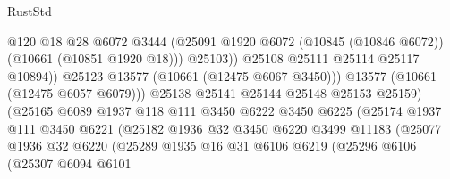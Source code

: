 \begin{lexlean}{RustStd}
\begin{coremodule}
                                        @120
                                        @18
                                        @28
                                        @6072
                                        @3444
                                        (@25091
                                          @1920
                                          @6072
                                          (@10845 (@10846 @6072))
                                          (@10661 (@10851 @1920 @18)))
                                        @25103))
                                    @25108
                                    @25111
                                    @25114
                                    @25117
                                    @10894))
                                @25123
                                @13577
                                (@10661 (@12475 @6067 @3450)))
                              @13577
                              (@10661 (@12475 @6057 @6079)))
                            @25138
                            @25141
                            @25144
                            @25148
                            @25153
                            @25159)
                          (@25165
                            @6089
                            @1937
                            @118
                            @111
                            @3450
                            @6222
                            @3450
                            @6225
                            (@25174
                              @1937
                              @111
                              @3450
                              @6221
                              (@25182
                                @1936
                                @32
                                @3450
                                @6220
                                @3499
                                @11183
                                (@25077
                                  @1936
                                  @32
                                  @6220
                                  (@25289
                                    @1935
                                    @16
                                    @31
                                    @6106
                                    @6219
                                    (@25296
                                      @6106
                                      (@25307
                                        @6094
                                        @6101

\end{coremodule}
\end{lexlean}

